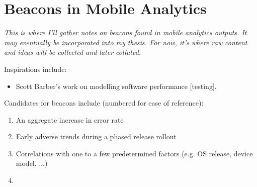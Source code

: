 \section{Beacons in Mobile Analytics}
\textit{This is where I'll gather notes on beacons found in mobile analytics outputs. It may eventually be incorporated into my thesis. For now, it's where raw content and ideas will be collected and later collated.}

Inspirations include:
\begin{itemize}
    \item Scott Barber's work on modelling software performance [testing].
\end{itemize}

Candidates for beacons include (numbered for ease of reference):
\begin{enumerate}
    \item An aggregate increase in error rate
    \item Early adverse trends during a phased release rollout
    \item Correlations with one to a few predetermined factors (e.g. OS release, device model, ...)
    \item 
\end{enumerate}